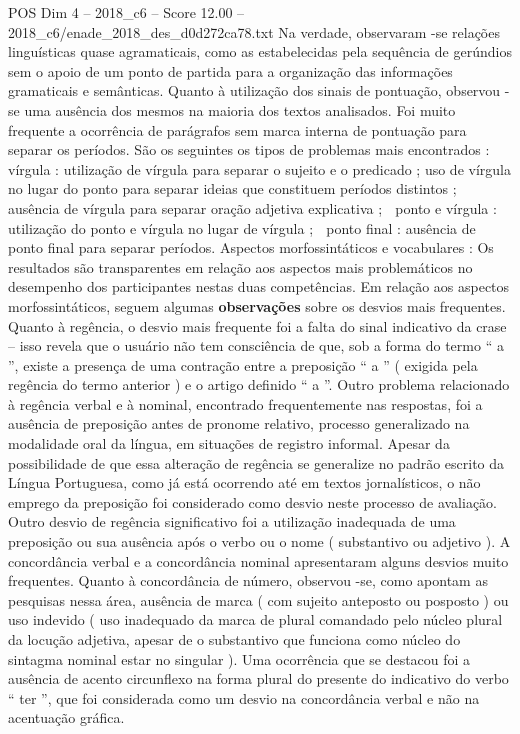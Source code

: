 \begin{textsample}{POS Dim 4 – 2018\_c6 – Score 12.00 – 2018\_c6/enade\_2018\_des\_d0d272ca78.txt}
Na verdade, observaram -se relações linguísticas quase agramaticais, como as estabelecidas pela sequência de gerúndios sem o apoio de um ponto de partida para a organização das informações gramaticais e semânticas.
Quanto à utilização dos sinais de pontuação, observou -se uma ausência dos mesmos na maioria dos textos analisados.
Foi muito frequente a ocorrência de parágrafos sem marca interna de pontuação para separar os períodos.
São os seguintes os tipos de problemas mais encontrados :  vírgula : utilização de vírgula para separar o sujeito e o predicado ; uso de vírgula no lugar do ponto para separar ideias que constituem períodos distintos ; ausência de vírgula para separar oração adjetiva explicativa ;  ponto e vírgula : utilização do ponto e vírgula no lugar de vírgula ;  ponto final : ausência de ponto final para separar períodos.
Aspectos morfossintáticos e vocabulares : Os resultados são transparentes em relação aos aspectos mais problemáticos no desempenho dos participantes nestas duas competências.
Em relação aos aspectos morfossintáticos, seguem algumas \textbf{observações} sobre os desvios mais frequentes.
Quanto à regência, o desvio mais frequente foi a falta do sinal indicativo da crase – isso revela que o usuário não tem consciência de que, sob a forma do termo “ a ”, existe a presença de uma contração entre a preposição “ a ” ( exigida pela regência do termo anterior ) e o artigo definido “ a ”.
Outro problema relacionado à regência verbal e à nominal, encontrado frequentemente nas respostas, foi a ausência de preposição antes de pronome relativo, processo generalizado na modalidade oral da língua, em situações de registro informal.
Apesar da possibilidade de que essa alteração de regência se generalize no padrão escrito da Língua Portuguesa, como já está ocorrendo até em textos jornalísticos, o não emprego da preposição foi considerado como desvio neste processo de avaliação.
Outro desvio de regência significativo foi a utilização inadequada de uma preposição ou sua ausência após o verbo ou o nome ( substantivo ou adjetivo ).
A concordância verbal e a concordância nominal apresentaram alguns desvios muito frequentes.
Quanto à concordância de número, observou -se, como apontam as pesquisas nessa área, ausência de marca ( com sujeito anteposto ou posposto ) ou uso indevido ( uso inadequado da marca de plural comandado pelo núcleo plural da locução adjetiva, apesar de o substantivo que funciona como núcleo do sintagma nominal estar no singular ).
Uma ocorrência que se destacou foi a ausência de acento circunflexo na forma plural do presente do indicativo do verbo “ ter ”, que foi considerada como um desvio na concordância verbal e não na acentuação gráfica.

\end{textsample}
